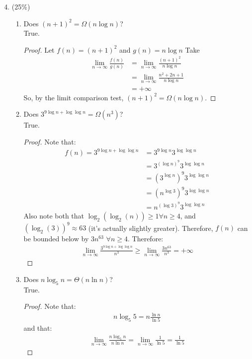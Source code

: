 \documentclass[11pt]{article}
\begin{document}
\begin{enumerate}
\setcounter{enumi}{3}
\item (25\%)
\begin{enumerate}
\item Does $(n+1)^2 = \Omega(n \log n)$?
\\
True.
\begin{proof}
Let $f(n) = (n+1)^2$ and $g(n)= n \log n$
Take 
\begin{align*}
\lim_{n \to \infty}\frac{f(n)}{g(n)} &= \lim_{n \to \infty} \frac{(n+1)^2}{n \log n}
\\&= \lim_{n \to \infty} \frac{n^2+2n+1}{n \log n} 
\\&= + \infty
\end{align*}
So, by the limit comparison test, $(n+1)^2 = \Omega(n \log n)$.
\end{proof}
\item Does $3^{9 \log n + \log \log n} = \Omega{(n^3)}$?
\\
True.
\begin{proof}
Note that:
\begin{align*}
f(n) = 3^{9 \log n + \log \log n} &= 3^{9 \log n }3^{\log \log n}
\\&=3^{(\log n)^9} 3^{\log \log n}
\\&=(3^{\log n})^9 3^{\log \log n}
\\&=(n^{\log 3})^9 3^{\log \log n}
\\&=n^{( \log 3)^9} 3^{\log \log n}
\end{align*}
Also note both that $\log_2(\log_2 (n)) \geq 1 \forall n\geq 4$, and $(\log_2(3))^9 \approx 63$ (it's actually slightly greater).  Therefore,
$f(n)$ can be bounded below by $3n^{63}$  $\forall n \geq 4$.  Therefore:
\begin{align*}
\lim_{n \to \infty} \frac{3^{9 \log n + \log \log n}} {n^3} \geq \lim_{n \to \infty} \frac{3n^{63}}{n^3} = +\infty
\end{align*} 
\end{proof}
\item Does $n \log_5 n = \Theta(n \ln n)$?
\\
True.
\begin{proof}
Note that:
\begin{align*}
n \log_5{5} = n \frac{\ln{n}}{\ln{5}}
\end{align*}
and that:
\begin{align*}
\lim_{n \to \infty} \frac{n \log_5{n}}{ n \ln{n}} = \lim_{n \to \infty}\frac{1}{\ln{5}}= \frac{1}{\ln{5}}

\end{align*}
\end{proof}
\end{enumerate}
\end{enumerate}
\end{document}

